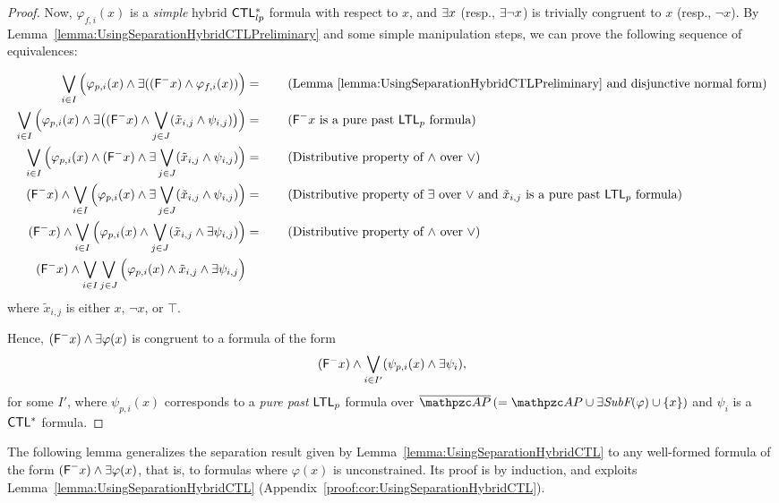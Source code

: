 \begin{proof}
 Now, $\varphi_{f,i}(x)$ is a \emph{simple} hybrid $\text{\sffamily CTL$^{*}_{lp}$}$ formula  with respect to $x$, and  $\exists x$ (resp., $\exists\neg x$) is trivially congruent to $x$ (resp., $\neg x$).
 By Lemma~\ref{lemma:UsingSeparationHybridCTLPreliminary} and some simple manipulation steps, we can prove the following sequence of equivalences:
 
 \begin{align*}
 \bigvee_{i\in I}\Big(\varphi_{p,i}(x)\wedge \EQ((\Eventually^{-} x)\wedge \varphi_{f,i}(x))\Big)&=%
 \tag*{(Lemma~\ref{lemma:UsingSeparationHybridCTLPreliminary} and disjunctive normal form)}\\
   \bigvee_{i\in I}\Big(\varphi_{p,i}(x) \wedge\EQ \big((\Eventually^{-} x)\wedge\bigvee_{j\in J}(\tilde{x}_{i,j}\wedge \psi_{i,j})\big)\Big)& =\tag*{($\Eventually^{-} x$ is a pure past $\LTLP$ formula)}\\
   \bigvee_{i\in I}\Big(\varphi_{p,i}(x) \wedge(\Eventually^{-} x)\wedge\EQ \bigvee_{j\in J}(\tilde{x}_{i,j}\wedge \psi_{i,j})\Big)&=\tag*{(Distributive property of $\wedge$ over $\vee$)}\\
 (\Eventually^{-} x)\wedge \bigvee_{i\in I}\Big(\varphi_{p,i}(x) \wedge\EQ \bigvee_{j\in J}(\tilde{x}_{i,j}\wedge \psi_{i,j})\Big)&=\tag*{(Distributive property of $\EQ$ over $\vee$ and $\tilde{x}_{i,j}$ is a pure past $\LTLP$ formula)}\\
 (\Eventually^{-} x)\wedge \bigvee_{i\in I}\Big(\varphi_{p,i}(x) \wedge \bigvee_{j\in J}(\tilde{x}_{i,j}\wedge \EQ\psi_{i,j})\Big)&=\tag*{(Distributive property of $\wedge$ over $\vee$)}\\
 (\Eventually^{-} x)\wedge \bigvee_{i\in I}\bigvee_{j\in J}\Big(\varphi_{p,i}(x) \wedge \tilde{x}_{i,j}\wedge \EQ\psi_{i,j}\Big)&
 \end{align*}
where $\tilde{x}_{i,j}$ is either $x$, $\neg x$, or $\top$.
 
 Hence, 
 $(\textsf{F}^{-} x)\wedge \exists \varphi(x)$ is congruent to a formula of the form
 \[(\textsf{F}^{-} x)\wedge \bigvee_{i\in I'}(\psi_{p,i}(x)\wedge \exists\psi_{i}),\] for some $I'$, where $\psi_{p,i}(x)$ corresponds 
 to a  \emph{pure past}  $\text{\sffamily LTL$_p$}$ formula over $\overline{\Prop} \,(=\Prop\cup  \EQSubf(\varphi) \cup \{x\})$
 and
 $\psi_i$ is a $\text{\sffamily CTL$^{*}$}$ formula.
\end{proof}

The following lemma generalizes the separation result given by Lemma~\ref{lemma:UsingSeparationHybridCTL} to any well-formed formula of the form $(\textsf{F}^{-} x)\wedge \exists \varphi(x)$, that is, to formulas where $\varphi(x)$ is unconstrained. Its proof is by induction, and exploits Lemma~\ref{lemma:UsingSeparationHybridCTL} (Appendix~\ref{proof:cor:UsingSeparationHybridCTL}).

